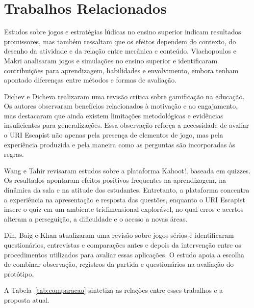 \documentclass[12pt]{article}
\begin{document}
\section{Trabalhos Relacionados}

Estudos sobre jogos e estratégias lúdicas no ensino superior indicam resultados promissores, mas também ressaltam que os efeitos dependem do contexto, do desenho da atividade e da relação entre mecânica e conteúdo. Vlachopoulos e Makri \cite{vlachopoulos2017} analisaram jogos e simulações no ensino superior e identificaram contribuições para aprendizagem, habilidades e envolvimento, embora tenham apontado diferenças entre métodos e formas de avaliação.

Dichev e Dicheva \cite{dichev2017} realizaram uma revisão crítica sobre gamificação na educação. Os autores observaram benefícios relacionados à motivação e ao engajamento, mas destacaram que ainda existem limitações metodológicas e evidências insuficientes para generalizações. Essa observação reforça a necessidade de avaliar o URI Escapist não apenas pela presença de elementos de jogo, mas pela experiência produzida e pela maneira como as perguntas são incorporadas às regras.

Wang e Tahir \cite{wang2020} revisaram estudos sobre a plataforma Kahoot!, baseada em quizzes. Os resultados apontaram efeitos positivos frequentes na aprendizagem, na dinâmica da sala e na atitude dos estudantes. Entretanto, a plataforma concentra a experiência na apresentação e resposta das questões, enquanto o URI Escapist insere o quiz em um ambiente tridimensional explorável, no qual erros e acertos alteram a perseguição, a dificuldade e o acesso a novas áreas.

Din, Baig e Khan \cite{din2023} atualizaram uma revisão sobre jogos sérios e identificaram questionários, entrevistas e comparações antes e depois da intervenção entre os procedimentos utilizados para avaliar essas aplicações. O estudo apoia a escolha de combinar observação, registros da partida e questionários na avaliação do protótipo.

A Tabela~\ref{tab:comparacao} sintetiza as relações entre esses trabalhos e a proposta atual.
\end{document}
